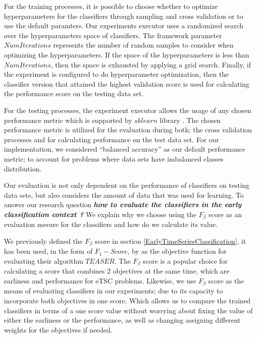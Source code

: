 For the training processes, it is possible to choose whether to optimize hyperparameters for the classifiers through sampling and cross validation or to use the default paramters.
Our experiments executor uses a randomized search over the hyperparameters space of classifiers.
The framework parameter $NumIterations$ represents the number of random samples to consider when optimizing the hyperparameters.
If the space of the hyperparameters is less than $NumIterations$, then the space is exhausted by applying a grid search.
Finally, if the experiment is configured to do hyperparameter optimization,
then the classifier version that attained the highest validation score is used for calculating the performance score on the testing data set.

For the testing processes, the experiment executor allows the usage of any chosen performance metric which is supported by $sklearn$ library \cite{scikit-learn}.
The chosen performance metric is utilized for the evaluation during both; the cross validation processes and for calculating performance on the test data set.
For our implementation, we considered \enquote{balanced accuracy} as our default performance metric; to account for problems where data sets have imbalanced classes distribution.

Our evaluation is not only dependent on the performance of classifiers on testing data sets, but also considers the amount of data that was used for learning.
To answer our research question \textbf{\textit{how to evaluate the classifiers in the early classification context ?}}
We explain why we choose using the $F_{\beta}$ score as an evaluation mesure for the classifiers and how do we calculate its value.

We previously defined the $F_{\beta}$ score in section \ref{EarlyTimeSeriesClassification}, it has been used, in the form of $F_{1}-Score$, by \cite{schafer2020teaser} as the objective function for evaluating their algorithm $TEASER$.
The $F_{\beta}$ score is a popular choice for calculating a score that combines 2 objectives at the same time, which are earliness and performance for eTSC problems.
Likewise, we use $F_{\beta}$ score as the means of evaluating classifiers in our experiments; due to its capacity to incorporate both objectives in one score.
Which allows us to compare the trained classifiers in terms of a one score value without worrying about fixing the value of either the earliness or the performance,
as well as changing assigning different weights for the objectives if needed.


